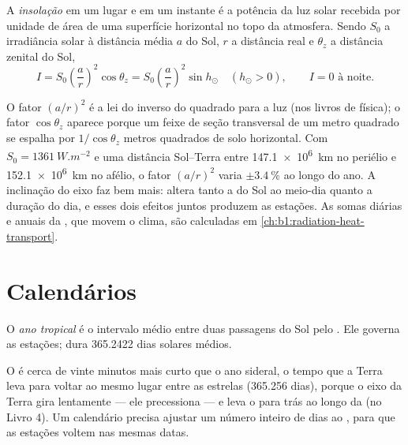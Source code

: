\begin{definition}[Insolação]\label{def:b1:spherical-astronomy:insolation}
A \emph{insolação} em um lugar e em um instante é a potência da luz solar recebida por unidade de área de uma superfície horizontal no topo da atmosfera. Sendo $S_0$ a irradiância solar à distância média $a$ do Sol, $r$ a distância real e $\theta_z$ a distância zenital do Sol,
\[
  I = S_0\left(\frac{a}{r}\right)^{2}\cos\theta_z = S_0\left(\frac{a}{r}\right)^{2}\sin h_\odot
  \quad (h_\odot > 0), \qquad I = 0 \text{ à noite}.
\]
\end{definition}

O fator $(a/r)^2$ é a lei do inverso do quadrado para a luz (nos livros de física); o fator $\cos\theta_z$ aparece porque um feixe de seção transversal de um metro quadrado se espalha por $1/\cos\theta_z$ metros quadrados de solo horizontal. Com
$S_0 = \qty{1361}{W.m^{-2}}$ e uma distância Sol--Terra entre \qty{147.1e6}{km} no periélio e \qty{152.1e6}{km} no afélio, o fator $(a/r)^2$ varia $\pm\qty{3.4}{\percent}$ ao longo do ano. A
inclinação do eixo faz bem mais: altera tanto a  do Sol ao meio-dia quanto a duração do dia, e esses dois efeitos juntos produzem as estações. As somas diárias e anuais da , que movem o clima, são calculadas em
\cref{ch:b1:radiation-heat-transport}.


\section{Calendários}

\begin{definition}\label{def:b1:spherical-astronomy:tropical-year}
O \emph{ano tropical} é o intervalo médio entre duas passagens do Sol pelo . Ele governa as estações; dura 365.2422 dias solares médios.
\end{definition}

O  é cerca de vinte minutos mais curto que o ano sideral, o tempo que a Terra leva para voltar ao mesmo lugar entre as estrelas (365.256 dias), porque o eixo da Terra gira lentamente --- ele precessiona --- e leva o  para trás ao longo da  (no Livro 4). Um calendário precisa ajustar um número inteiro de dias ao , para que as estações voltem nas mesmas datas.

